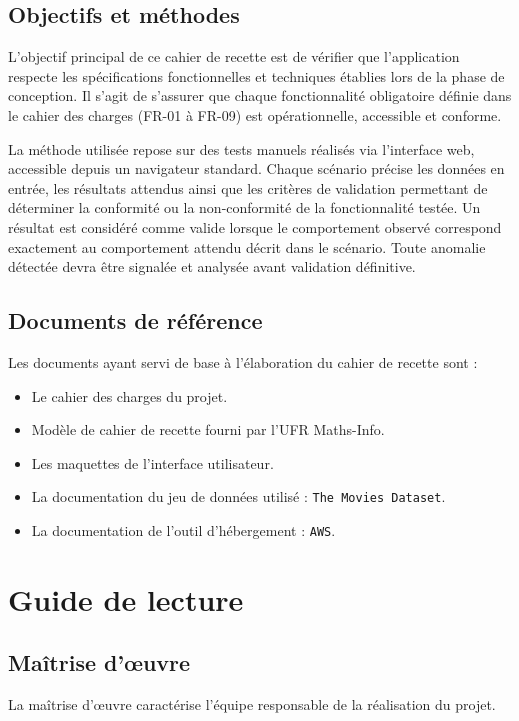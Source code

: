 \documentclass[a4paper,12pt]{report}
\begin{document}
\section{Objectifs et méthodes}
L’objectif principal de ce cahier de recette est de vérifier que l’application respecte les spécifications fonctionnelles et techniques établies lors de la phase de conception. Il s’agit de s’assurer que chaque fonctionnalité obligatoire définie dans le cahier des charges (FR-01 à FR-09) est opérationnelle, accessible et conforme.

La méthode utilisée repose sur des tests manuels réalisés via l’interface web, accessible depuis un navigateur standard. Chaque scénario précise les données en entrée, les résultats attendus ainsi que les critères de validation permettant de déterminer la conformité ou la non-conformité de la fonctionnalité testée. Un résultat est considéré comme valide lorsque le comportement observé correspond exactement au comportement attendu décrit dans le scénario. Toute anomalie détectée devra être signalée et analysée avant validation définitive.

\section{Documents de référence}
Les documents ayant servi de base à l’élaboration du cahier de recette sont :

\begin{itemize}
    \item Le cahier des charges du projet.
    \item Modèle de cahier de recette fourni par l'UFR Maths-Info.
    \item Les maquettes de l’interface utilisateur.
    \item La documentation du jeu de données utilisé : \texttt{The Movies Dataset}.
    \item La documentation de l’outil d’hébergement : \texttt{AWS}.
\end{itemize}
 

\chapter{Guide de lecture}
\section{Maîtrise d’œuvre}
La maîtrise d'œuvre caractérise l'équipe responsable de la réalisation du projet.
\end{document}

